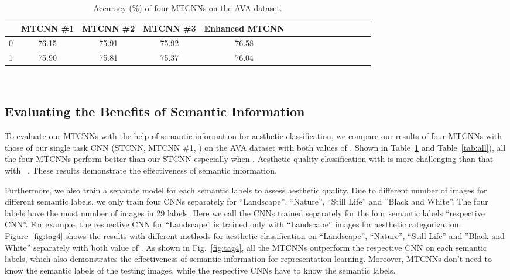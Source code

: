 \documentclass[journal]{IEEEtran}
\begin{document}
\begin{table}
\caption{Accuracy (\%) of four MTCNNs on the AVA dataset.}
\renewcommand{\arraystretch}{1.4}
\newcommand{\tabincell}[2]{\begin{tabular}{@{}#1@{}}#2\end{tabular}}
\setlength{\abovecaptionskip}{0pt}
\setlength{\belowcaptionskip}{0pt}
\arrayrulewidth=0.6pt \tabcolsep=3pt
  \centering
\small
  \begin{tabular}{|c|c|c|c|c|c|c|c|c||c|c|c|c|c|c}
    \hline
  & MTCNN  \#1 & MTCNN \#2 & MTCNN \#3 & Enhanced MTCNN \\
    \hline
0 &76.15&75.91 & 75.92& 76.58 \\
     \hline
    1 &75.90&75.81& 75.37&76.04\\
    \hline
  \end{tabular}
\verb''\\
\label{tab:mt4res}
\end{table}





\subsection{Evaluating the Benefits of Semantic Information }
To evaluate our MTCNNs with the help of semantic information for aesthetic classification, we compare our results of four MTCNNs with those of our single task CNN (STCNN, MTCNN \#1, ) on the AVA dataset with both values of . Shown in Table~\ref{tab:mt4res} and Table~\ref{tab:all}), all the four MTCNNs perform better than our STCNN especially when . Aesthetic quality classification with  is more challenging than that with ~\cite{Murray12}. These results demonstrate the effectiveness of semantic information.


Furthermore, we also train a separate model for each semantic labels to assess aesthetic quality. Due to different number of images for different semantic labels, we only train four CNNs separately for ``Landscape'', ``Nature'', ``Still Life'' and ''Black and White''. The four labels have the most number of images in 29 labels. Here we call the CNNs trained separately for the four semantic labels ``respective CNN''. For example, the respective CNN for ``Landscape'' is trained only with ``Landscape'' images for aesthetic categorization. Figure~\ref{fig:tag4} shows the results with different methods for aesthetic classification on ``Landscape'', ``Nature'', ``Still Life'' and ''Black and White'' separately with both value of . As shown in Fig.~\ref{fig:tag4}, all the MTCNNs outperform the respective CNN on each semantic labels, which also demonstrates the effectiveness of semantic information for representation learning. Moreover, MTCNNs don't need to know the semantic labels of the testing images, while the respective CNNs have to know the semantic labels.
\end{document}
